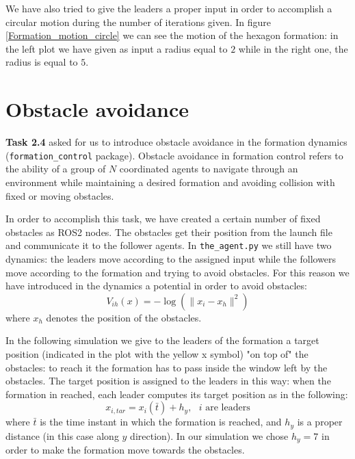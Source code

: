 \documentclass[a4paper,11pt,oneside]{book}
\begin{document}
\bigskip
We have also tried to give the leaders a proper input in order to accomplish a circular motion during the number of iterations given. In figure \ref{Formation_motion_circle} we can see the motion of the hexagon formation: in the left plot we have given as input a radius equal to $2$ while in the right one, the radius is equal to $5$.



\section{Obstacle avoidance}
\textbf{Task 2.4} asked for us to introduce obstacle avoidance in the formation dynamics (\texttt{formation\_control} package). Obstacle avoidance in formation control refers to the ability of a group of $N$ coordinated agents to navigate through an environment while maintaining a desired formation and avoiding collision with fixed or moving obstacles. 

In order to accomplish this task, we have created a certain number of fixed obstacles as ROS2 nodes. The obstacles get their position from the launch file and communicate it to the follower agents. 
In \texttt{the\_agent.py} we still have two dynamics: the leaders move according to the assigned input while the followers move according to the formation and trying to avoid obstacles. For this reason we have introduced in the dynamics a potential in order to avoid obstacles:
\begin{equation}
V_{ih}(x) = - \log( \lVert x_i - x_h\rVert ^2)
\label{Obstacles_barrier}
\end{equation}
where $x_h$ denotes the position of the obstacles.

\bigskip
In the following simulation we give to the leaders of the formation a target position (indicated in the plot with the yellow x symbol) "on top of" the obstacles: to reach it the formation has to pass inside the window left by the obstacles. 
The target position is assigned to the leaders in this way: when the formation in reached, each leader computes its target position as in the following:
\begin{equation}
x_{i,tar} = x_i(\bar{t}) + h_y, \text{     $i$ are leaders}
\end{equation}
where $\bar{t}$ is the time instant in which the formation is reached, and $h_y$ is a proper distance (in this case along $y$ direction). In our simulation we chose $h_y = 7$ in order to make the formation move towards the obstacles.
\end{document}
